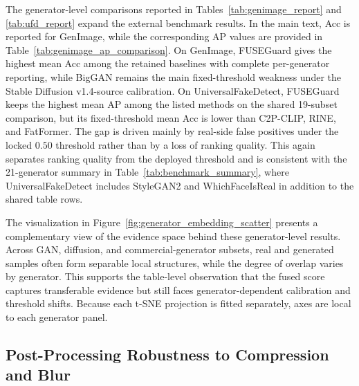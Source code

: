 \documentclass[letterpaper,journal]{IEEEtran}
\begin{document}
The generator-level comparisons reported in Tables~\ref{tab:genimage_report} and \ref{tab:ufd_report} expand the external benchmark results. In the main text, Acc is reported for GenImage, while the corresponding AP values are provided in Table~\ref{tab:genimage_ap_comparison}. On GenImage, FUSEGuard gives the highest mean Acc among the retained baselines with complete per-generator reporting, while BigGAN remains the main fixed-threshold weakness under the Stable Diffusion v1.4-source calibration. On UniversalFakeDetect, FUSEGuard keeps the highest mean AP among the listed methods on the shared 19-subset comparison, but its fixed-threshold mean Acc is lower than C2P-CLIP, RINE, and FatFormer. The gap is driven mainly by real-side false positives under the locked $0.50$ threshold rather than by a loss of ranking quality. This again separates ranking quality from the deployed threshold and is consistent with the 21-generator summary in Table~\ref{tab:benchmark_summary}, where UniversalFakeDetect includes StyleGAN2 and WhichFaceIsReal in addition to the shared table rows.

The visualization in Figure~\ref{fig:generator_embedding_scatter} presents a complementary view of the evidence space behind these generator-level results. Across GAN, diffusion, and commercial-generator subsets, real and generated samples often form separable local structures, while the degree of overlap varies by generator. This supports the table-level observation that the fused score captures transferable evidence but still faces generator-dependent calibration and threshold shifts. Because each t-SNE projection is fitted separately, axes are local to each generator panel.


\subsection{Post-Processing Robustness to Compression and Blur}
\label{sec:input_perturbation_robustness}
\end{document}
